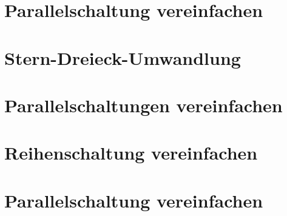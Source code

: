 \documentclass[fleqn,12pt]{article}
\begin{document}
\section{Parallelschaltung vereinfachen}

\section{Stern-Dreieck-Umwandlung}

\section{Parallelschaltungen vereinfachen}

\section{Reihenschaltung vereinfachen}

\section{Parallelschaltung vereinfachen}

\end{document}
